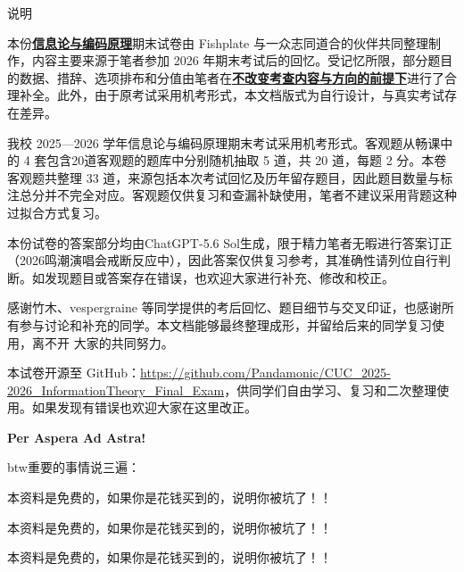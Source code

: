 \documentclass[UTF8,a4paper,12pt]{ctexart}
\begin{document}
\thispagestyle{empty}

\begin{center}
    {\heiti{} 说明}
\end{center}

\vspace{2em}

本份\underline{\textbf{信息论与编码原理}}期末试卷由 Fishplate 与一众志同道合的伙伴共同整理制作，内容主要来源于笔者参加 2026 年期末考试后的回忆。受记忆所限，部分题目的数据、措辞、选项排布和分值由笔者在\underline{\textbf{不改变考查内容与方向的前提下}}进行了合理补全。此外，由于原考试采用机考形式，本文档版式为自行设计，与真实考试存在差异。

\vspace{1em}

我校 2025—2026 学年信息论与编码原理期末考试采用机考形式。客观题从畅课中的 4 套包含20道客观题的题库中分别随机抽取 5 道，共 20 道，每题 2 分。本卷客观题共整理 33 道，来源包括本次考试回忆及历年留存题目，因此题目数量与标注总分并不完全对应。客观题仅供复习和查漏补缺使用，笔者不建议采用背题这种过拟合方式复习。

\vspace{1em}

本份试卷的答案部分均由ChatGPT-5.6 Sol生成，限于精力笔者无暇进行答案订正（2026鸣潮演唱会戒断反应中），因此答案仅供复习参考，其准确性请列位自行判断。如发现题目或答案存在错误，也欢迎大家进行补充、修改和校正。

\vspace{1em}

感谢竹木、vespergraine 等同学提供的考后回忆、题目细节与交叉印证，也感谢所有参与讨论和补充的同学。本文档能够最终整理成形，并留给后来的同学复习使用，离不开
大家的共同努力。



\begin{center}

{}

\end{center}


本试卷开源至 GitHub：\url{https://github.com/Pandamonic/CUC_2025-2026_InformationTheory_Final_Exam}，供同学们自由学习、复习和二次整理使用。如果发现有错误也欢迎大家在这里改正。

\vspace{1em}

\begin{center}

{}

{\textbf{Per Aspera Ad Astra!}}

\vspace{1em}

{\heiti btw重要的事情说三遍：}

\vspace{1em}

{\heiti 本资料是免费的，如果你是花钱买到的，说明你被坑了！！}

{\heiti 本资料是免费的，如果你是花钱买到的，说明你被坑了！！}

{\heiti 本资料是免费的，如果你是花钱买到的，说明你被坑了！！}

\end{center}
\end{document}

